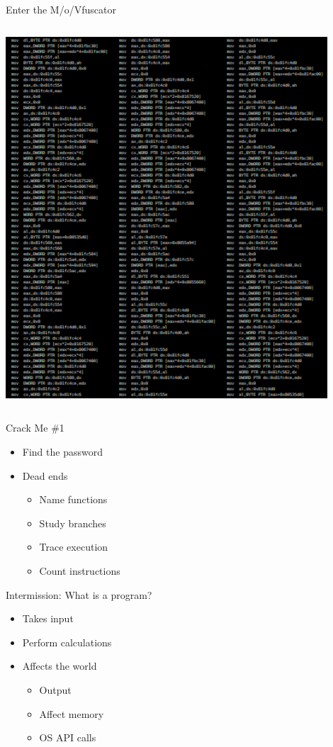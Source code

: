 \documentclass[10pt, compress]{beamer}
\begin{document}
\begin{frame}{Enter the M/o/Vfuscator}
\begin{columns}
\begin{column}{0.4\textwidth}
			\includegraphics[width=0.9\textwidth]{images/mov_asm.png}
		\end{column}
	\end{columns}

  
\end{frame}

\begin{frame}{Crack Me \#1}
  \begin{itemize}
    \item Find the password
    \item Dead ends
    \begin{itemize}
      \item Name functions
      \item Study branches
      \item Trace execution
      \item Count instructions
    \end{itemize}
  \end{itemize}
\end{frame}

\begin{frame}{Intermission: What is a program?}
  \begin{itemize}
    \item Takes input
    \item Perform calculations
    \item Affects the world   
    \begin{itemize}
      \item Output
      \item Affect memory
      \item OS API calls
    \end{itemize}
  \end{itemize}
\end{frame}
\end{document}
